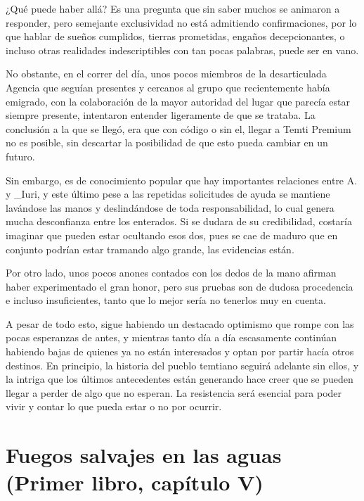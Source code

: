 \documentclass[
]{book}
\begin{document}
¿Qué puede haber allá? Es una pregunta que sin saber muchos se animaron a responder, pero semejante exclusividad no está admitiendo confirmaciones, por lo que hablar de sueños cumplidos, tierras prometidas, engaños decepcionantes, o incluso otras realidades indescriptibles con tan pocas palabras, puede ser en vano.

No obstante, en el correr del día, unos pocos miembros de la desarticulada Agencia que seguían presentes y cercanos al grupo que recientemente había emigrado, con la colaboración de la mayor autoridad del lugar que parecía estar siempre presente, intentaron entender ligeramente de que se trataba. La conclusión a la que se llegó, era que con código o sin el, llegar a Temti Premium no es posible, sin descartar la posibilidad de que esto pueda cambiar en un futuro.

Sin embargo, es de conocimiento popular que hay importantes relaciones entre A. y \_Iuri, y este último pese a las repetidas solicitudes de ayuda se mantiene lavándose las manos y deslindándose de toda responsabilidad, lo cual genera mucha desconfianza entre los enterados. Si se dudara de su credibilidad, costaría imaginar que pueden estar ocultando esos dos, pues se cae de maduro que en conjunto podrían estar tramando algo grande, las evidencias están.

Por otro lado, unos pocos anones contados con los dedos de la mano afirman haber experimentado el gran honor, pero sus pruebas son de dudosa procedencia e incluso insuficientes, tanto que lo mejor sería no tenerlos muy en cuenta.

A pesar de todo esto, sigue habiendo un destacado optimismo que rompe con las pocas esperanzas de antes, y mientras tanto día a día escasamente continúan habiendo bajas de quienes ya no están interesados y optan por partir hacía otros destinos. En principio, la historia del pueblo temtiano seguirá adelante sin ellos, y la intriga que los últimos antecedentes están generando hace creer que se pueden llegar a perder de algo que no esperan. La resistencia será esencial para poder vivir y contar lo que pueda estar o no por ocurrir.

\hypertarget{fuegos-salvajes-en-las-aguas-primer-libro-capuxedtulo-v}{%
\section{Fuegos salvajes en las aguas (Primer libro, capítulo V)}\label{fuegos-salvajes-en-las-aguas-primer-libro-capuxedtulo-v}}
\end{document}
